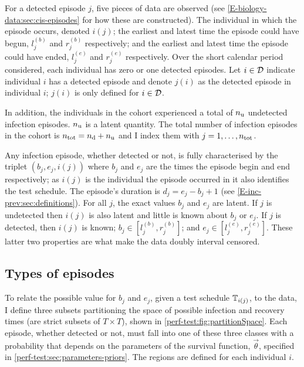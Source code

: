 \documentclass[thesis.tex]{subfiles}
\begin{document}
For a detected episode $j$, five pieces of data are observed (see \cref{E-biology-data:sec:cis-episodes} for how these are constructed).
The individual in which the episode occurs, denoted $i(j)$; the earliest and latest time the episode could have begun, $l_j^{(b)}$ and $r_j^{(b)}$ respectively; and the earliest and latest time the episode could have ended, $l_j^{(e)}$ and $r_j^{(e)}$ respectively.
Over the short calendar period considered, each individual has zero or one detected episodes.
Let $i \in \mathcal{D}$ indicate individual $i$ has a detected episode and denote $j(i)$ as the detected episode in individual $i$; $j(i)$ is only defined for $i \in \mathcal{D}$.

In addition, the individuals in the cohort experienced a total of $n_\text{u}$ undetected infection episodes.
$n_\text{u}$ is a latent quantity.
The total number of infection episodes in the cohort is $n_\text{tot} = n_\text{d} + n_\text{u}$ and I index them with $j = 1, \dots, n_\text{tot}$.

Any infection episode, whether detected or not, is fully characterised by the triplet $(b_j, e_j, i(j))$ where $b_j$ and $e_j$ are the times the episode begin and end respectively; as $i(j)$ is the individual the episode occurred in it also identifies the test schedule.
The episode's duration is $d_j = e_j - b_j + 1$ (see \cref{E-inc-prev:sec:definitions}).
For all $j$, the exact values $b_j$ and $e_j$ are latent.
If $j$ is undetected then $i(j)$ is also latent and little is known about $b_j$ or $e_j$.
If $j$ is detected, then $i(j)$ is known; $b_j \in [l_j^{(b)}, r_j^{(b)}]$; and $e_j \in [l_j^{(e)}, r_j^{(e)}]$.
These latter two properties are what make the data doubly interval censored.

\subsection{Types of episodes} \label{perf-test:sec:episode-types}

To relate the possible value for $b_j$ and $e_j$, given a test schedule $\mathbb{T}_{i(j)}$, to the data, I define three subsets partitioning the space of possible infection and recovery times (\ie are strict subsets of $T \times T$), shown in \cref{perf-test:fig:partitionSpace}.
Each episode, whether detected or not, must fall into one of these three classes with a probability that depends on the parameters of the survival function, $\vec{\theta}$, specified in \cref{perf-test:sec:parameters-priors}.
The regions are defined for each individual $i$.
\end{document}
